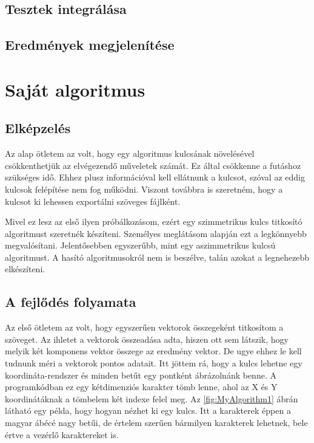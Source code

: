 \documentclass[12pt]{report} %
\begin{document}
\section{Tesztek integrálása} %

\section{Eredmények megjelenítése} %

\chapter{Saját algoritmus} %

\section{Elképzelés} %

Az alap ötletem az volt, hogy egy algoritmus kulcsának növelésével csökkenthetjük az elvégezendő műveletek számát. Ez által csökkenne a futáshoz szükséges idő. Ehhez plusz információval kell ellátnunk a kulcsot, szóval az eddig kulcsok felépítése nem fog működni. Viszont továbbra is szeretném, hogy a kulcsot ki lehessen exportálni szöveges fájlként.

Mivel ez lesz az első ilyen próbálkozásom, ezért egy szimmetrikus kulcs titkosító algoritmust szeretnék készíteni. Személyes meglátásom alapján ezt a legkönnyebb megvalósítani. Jelentősebben egyszerűbb, mint egy aszimmetrikus kulcsú algoritmust. A hasító algoritmusokról nem is beszélve, talán azokat a legnehezebb elkészíteni.

\section{A fejlődés folyamata} %

Az első ötletem az volt, hogy egyszerűen vektorok összegeként titkosítom a szöveget. Az ihletet a vektorok összeadása adta, hiszen ott sem látszik, hogy melyik két komponens vektor összege az eredmény vektor. De ugye ehhez le kell tudnunk méri a vektorok pontos adatait. Itt jöttem rá, hogy a kulcs lehetne egy koordináta-rendszer és minden betűt egy pontként ábrázolnánk benne. A programkódban ez egy kétdimenziós karakter tömb lenne, ahol az X és Y koordinátáknak a tömbelem két indexe felel meg. Az \ref{fig:MyAlgorithm1} ábrán látható egy példa, hogy hogyan nézhet ki egy kulcs. Itt a karakterek éppen a magyar ábécé nagy betűi, de értelem szerűen bármilyen karakterek lehetnek, bele értve a vezérlő karaktereket is.
\end{document}
